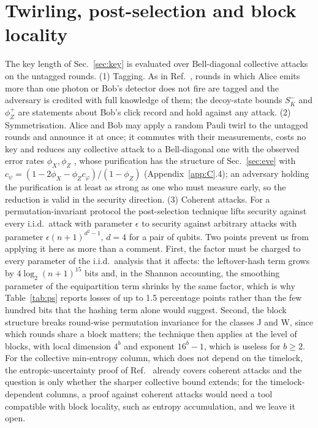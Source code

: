 \documentclass[aps,pra,twocolumn,superscriptaddress,nofootinbib]{revtex4-2}
\begin{document}
\section{Twirling, post-selection and block locality}\label{app:B}
The key length of Sec.~\ref{sec:key} is evaluated over Bell-diagonal collective attacks on the untagged rounds. (1) Tagging. As in Ref.~\cite{T25}, rounds in which Alice emits more than one photon or Bob's detector does not fire are tagged and the adversary is credited with full knowledge of them; the decoy-state bounds $S^-_{\bar K}$ and $\phi^+_Z$ are statements about Bob's click record and hold against any attack. (2) Symmetrisation. Alice and Bob may apply a random Pauli twirl to the untagged rounds and announce it at once; it commutes with their measurements, costs no key and reduces any collective attack to a Bell-diagonal one with the observed error rates $\phi_X,\phi_Z$ \cite{KGR05,RGK05}, whose purification has the structure of Sec.~\ref{sec:eve} with $c_\psi=(1-2\phi_X-\phi_Zc_\varphi)/(1-\phi_Z)$ (Appendix~\ref{app:C}.4); an adversary holding the purification is at least as strong as one who must measure early, so the reduction is valid in the security direction. (3) Coherent attacks. For a permutation-invariant protocol the post-selection technique \cite{CKR09} lifts security against every i.i.d.\ attack with parameter $\epsilon$ to security against arbitrary attacks with parameter $\epsilon(n+1)^{d^2-1}$, $d=4$ for a pair of qubits. Two points prevent us from applying it here as more than a comment. First, the factor must be charged to every parameter of the i.i.d.\ analysis that it affects: the leftover-hash term grows by $4\log_2(n+1)^{15}$ bits and, in the Shannon accounting, the smoothing parameter of the equipartition term shrinks by the same factor, which is why Table~\ref{tab:ps} reports losses of up to 1.5 percentage points rather than the few hundred bits that the hashing term alone would suggest. Second, the block structure breaks round-wise permutation invariance for the classes J and W, since which rounds share a block matters; the technique then applies at the level of blocks, with local dimension $4^b$ and exponent $16^b-1$, which is useless for $b\ge2$. For the collective min-entropy column, which does not depend on the timelock, the entropic-uncertainty proof of Ref.~\cite{T25} already covers coherent attacks and the question is only whether the sharper collective bound extends; for the timelock-dependent columns, a proof against coherent attacks would need a tool compatible with block locality, such as entropy accumulation, and we leave it open.
\end{document}
